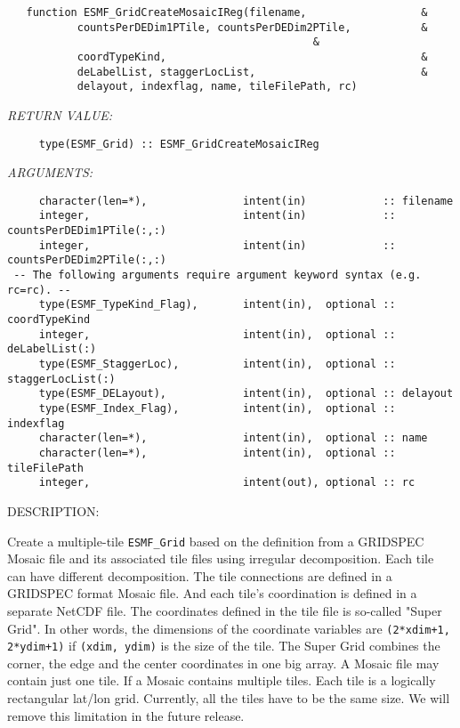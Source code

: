  
\begin{verbatim}   function ESMF_GridCreateMosaicIReg(filename,                  &
           countsPerDEDim1PTile, countsPerDEDim2PTile,           &
                                                &
           coordTypeKind,                                        &
           deLabelList, staggerLocList,                          &
           delayout, indexflag, name, tileFilePath, rc)\end{verbatim}{\em RETURN VALUE:}
\begin{verbatim}     type(ESMF_Grid) :: ESMF_GridCreateMosaicIReg\end{verbatim}{\em ARGUMENTS:}
\begin{verbatim}     character(len=*),               intent(in)            :: filename
     integer,                        intent(in)            :: countsPerDEDim1PTile(:,:)
     integer,                        intent(in)            :: countsPerDEDim2PTile(:,:)
 -- The following arguments require argument keyword syntax (e.g. rc=rc). --
     type(ESMF_TypeKind_Flag),       intent(in),  optional :: coordTypeKind
     integer,                        intent(in),  optional :: deLabelList(:)
     type(ESMF_StaggerLoc),          intent(in),  optional :: staggerLocList(:)
     type(ESMF_DELayout),            intent(in),  optional :: delayout
     type(ESMF_Index_Flag),          intent(in),  optional :: indexflag
     character(len=*),               intent(in),  optional :: name
     character(len=*),               intent(in),  optional :: tileFilePath
     integer,                        intent(out), optional :: rc
 \end{verbatim}
{\sf DESCRIPTION:\\ }


     Create a multiple-tile {\tt ESMF\_Grid} based on the definition from a GRIDSPEC Mosaic file and its associated
     tile files using irregular decomposition.  Each tile can have different decomposition.  The tile connections
     are defined in a GRIDSPEC format Mosaic file.
     And each tile's coordination is defined in a separate NetCDF file.  The coordinates defined
     in the tile file is so-called "Super Grid".  In other words, the dimensions of the coordinate variables are
     {\tt (2*xdim+1, 2*ydim+1)} if {\tt (xdim, ydim)} is the size of the tile.  The Super Grid combines the corner,
     the edge and the center coordinates in one big array.  A Mosaic file may contain just one tile.  If a Mosaic contains
     multiple tiles.  Each tile is a logically rectangular lat/lon grid.  Currently, all the tiles have to be the same size.
     We will remove this limitation in the future release.
  
